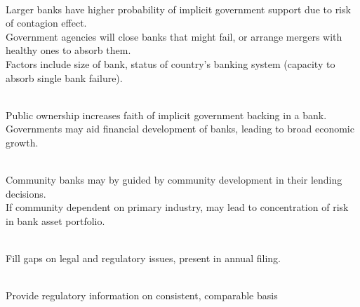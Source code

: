 \begin{remark} \\
Larger banks have higher probability of implicit government support due to risk of contagion effect.\\
Government agencies will close banks that might fail, or arrange mergers with healthy ones to absorb them.\\
Factors include size of bank, status of country’s banking system (capacity to absorb single bank failure).
\end{remark}

\begin{remark} \\
Public ownership increases faith of implicit government backing in a bank.\\
Governments may aid financial development of banks, leading to broad economic growth.
\end{remark}

\begin{remark} \\
Community banks may by guided by community development in their lending decisions.\\
If community dependent on primary industry, may lead to concentration of risk in bank asset portfolio.
\end{remark}

\begin{remark} \\
Fill gaps on legal and regulatory issues, present in annual filing.
\end{remark}

\begin{remark} \\
Provide regulatory information on consistent, comparable basis
\end{remark}


